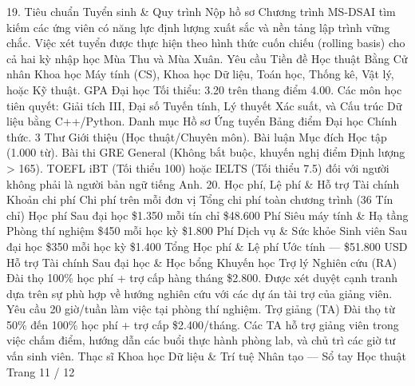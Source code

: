 \documentclass[12pt]{article}
\begin{document}
19. Tiêu chuẩn Tuyển sinh \& Quy trình Nộp hồ sơ
Chương trình MS-DSAI tìm kiếm các ứng viên có năng lực định lượng xuất sắc và nền tảng lập trình vững chắc. Việc xét tuyển được thực hiện theo hình thức cuốn chiếu (rolling basis) cho cả hai kỳ nhập học Mùa Thu và Mùa Xuân.
Yêu cầu Tiền đề Học thuật
Bằng Cử nhân Khoa học Máy tính (CS), Khoa học Dữ liệu, Toán học, Thống kê,
Vật lý, hoặc Kỹ thuật.
GPA Đại học Tối thiểu: 3.20 trên thang điểm 4.00.
Các môn học tiên quyết: Giải tích III, Đại số Tuyến tính,
Lý thuyết Xác suất, và Cấu trúc Dữ liệu bằng C++/Python.
Danh mục Hồ sơ Ứng tuyển
Bảng điểm Đại học Chính thức.
3 Thư Giới thiệu (Học thuật/Chuyên môn).
Bài luận Mục đích Học tập (1.000 từ).
Bài thi GRE General (Không bắt buộc, khuyến nghị
điểm Định lượng > 165).
TOEFL iBT (Tối thiểu 100) hoặc IELTS (Tối thiểu 7.5) đối với người không phải
là người bản ngữ tiếng Anh.
20. Học phí, Lệ phí \& Hỗ trợ Tài chính
Khoản chi phí
Chi phí trên mỗi đơn vị
Tổng chi phí toàn chương trình (36 Tín chỉ)
Học phí Sau đại học
\$1.350 mỗi tín chỉ
\$48.600
Phí Siêu máy tính \& Hạ tầng Phòng thí nghiệm
\$450 mỗi học kỳ
\$1.800
Phí Dịch vụ \& Sức khỏe Sinh viên Sau đại học
\$350 mỗi học kỳ
\$1.400
Tổng Học phí \& Lệ phí Ước tính
—
\$51.800 USD
Hỗ trợ Tài chính Sau đại học \& Học bổng Khuyến học
Trợ lý Nghiên cứu (RA)
Đài thọ 100\% học phí + trợ cấp hàng tháng \$2.800.
Được xét duyệt cạnh tranh dựa trên sự phù hợp về hướng nghiên cứu với
các dự án tài trợ của giảng viên. Yêu cầu 20 giờ/tuần làm việc tại phòng thí nghiệm.
Trợ giảng (TA)
Đài thọ từ 50\% đến 100\% học phí + trợ cấp \$2.400/tháng.
Các TA hỗ trợ giảng viên trong việc chấm điểm, hướng dẫn các buổi
thực hành phòng lab, và chủ trì các giờ tư vấn sinh viên.
Thạc sĩ Khoa học Dữ liệu \& Trí tuệ Nhân tạo — Sổ tay Học thuật
Trang 11 / 12
\end{document}
